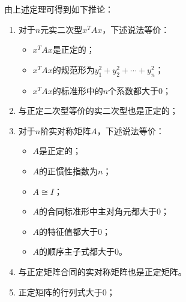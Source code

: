 \begin{theorem}\label{theo:PositiveDefinite}
	由上述定理可得到如下推论：
	\begin{enumerate}
		\item 对于$n$元实二次型$x^TAx$，下述说法等价：
		\begin{itemize}
			\item $x^TAx$是正定的；
			\item $x^TAx$的规范形为$y_1^2+y_2^2+\cdots+y_n^2$；
			\item $x^TAx$的标准形中的$n$个系数都大于$0$；
		\end{itemize}
		\item 与正定二次型等价的实二次型也是正定的；
		\item 对于$n$阶实对称矩阵$A$，下述说法等价：
		\begin{itemize}
			\item $A$是正定的；
			\item $A$的正惯性指数为$n$；
			\item $A\cong I$；
			\item $A$的合同标准形中主对角元都大于$0$；
			\item $A$的特征值都大于$0$；
			\item $A$的顺序主子式都大于$0$。
		\end{itemize}
		\item 与正定矩阵合同的实对称矩阵也是正定矩阵。
		\item 正定矩阵的行列式大于$0$；
	\end{enumerate}
\end{theorem}
